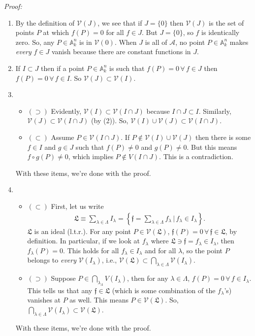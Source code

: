 \documentclass[12pt]{article}
\newcommand{\lc}{\left\{}
\newcommand{\rc}{\right\}}
\begin{document}
\noindent \textit{Proof:} 
\begin{enumerate}
	\item By the definition of $\mathcal{V}(J)$, we see that if $J = \{0\}$ then $\mathcal{V}(J)$ is the set of points $P$ at which $f(P) = 0$ for all $f \in J$. But $J = \{0\}$, so $f$ is identically zero. So, any $P\in \mathbb{A}^n_k$ is in $\mathcal{V}(0)$. When $J$ is all of $\mathcal{A}$, no point $P \in \mathbb{A}^n_k$ makes \textit{every} $f \in J$ vanish because there are constant functions in $J$. 
	\item If $I \subset J$ then if a point $P\in \mathbb{A}^n_k$ is such that $f(P) = 0\,\forall\, f\in J$ then $f(P) = 0\,\forall \, f \in I$. So $\mathcal{V}(J) \subset \mathcal{V}(I)$.
	\item 
	\begin{itemize}
		\item $(\supset)$ Evidently, $\mathcal{V}(I) \subset \mathcal{V}(I \cap J)$ because $I \cap J \subset I$. Similarly, $\mathcal{V}(J) \subset \mathcal{V}(I \cap J)$ (by (2)). So, $\mathcal{V}(I) \cup \mathcal{V}(J) \subset \mathcal{V}(I \cap J)$.
		\item $(\subset)$ Assume $P \in \mathcal{V}(I \cap J)$. If $P \notin \mathcal{V}(I) \cup \mathcal{V}(J)$ then there is some $f\in I$ and $g \in J$ such that $f(P) \neq 0$ and $g(P) \neq 0$. But this means $f\circ g(P) \neq 0$, which implies $P \notin V(I\cap J)$. This is a contradiction.
	\end{itemize}
	With these items, we're done with the proof. 
	\item \begin{itemize}
		\item $(\subset)$ First, let us write
		\begin{align*}
		\mathfrak{L} \equiv \sum_{\lambda \in \Lambda} I_\lambda  = \lc \mathfrak{f} =  \sum_{\lambda \in \Lambda} f_\lambda \,\bigg\vert\, f_\lambda \in I_\lambda \rc.
		\end{align*}
		$\mathfrak{L}$ is an ideal (l.t.r.). For any point $P \in \mathcal{V}(\mathfrak{L})$, $\mathfrak{f}(P) = 0\, \forall \, \mathfrak{f} \in \mathfrak{L}$, by definition. In particular, if we look at $f_\lambda$ where $\mathfrak{L} \ni \mathfrak{f} = f_\lambda \in I_\lambda $, then $f_\lambda(P) = 0$. This holds for all $f_\lambda \in I_\lambda$ and for all $\lambda$, so the point $P$ belongs to \textit{every} $\mathcal{V}(I_\lambda)$, i.e., $\mathcal{V}(\mathfrak{L}) \subset \bigcap_{\lambda\in \Lambda} \mathcal{V}(I_\lambda)$.   
		
		
		\item $(\supset)$ Suppose $P \in \bigcap_{\lambda_\Lambda} V(I_\lambda)$, then for any $\lambda \in \Lambda$, $f(P) = 0\, \forall \, f\in I_\lambda$. This tells us that any $\mathfrak{f} \in \mathfrak{L}$ (which is some combination of the $f_\lambda$'s) vanishes at $P$ as well. This means $P\in \mathcal{V}(\mathfrak{L})$. So, $\bigcap_{\lambda\in \Lambda}\mathcal{V}(I_\lambda) \subset \mathcal{V}(\mathfrak{L})$. 
	\end{itemize}
	With these items, we're done with the proof. 
\end{enumerate}
\end{document}
